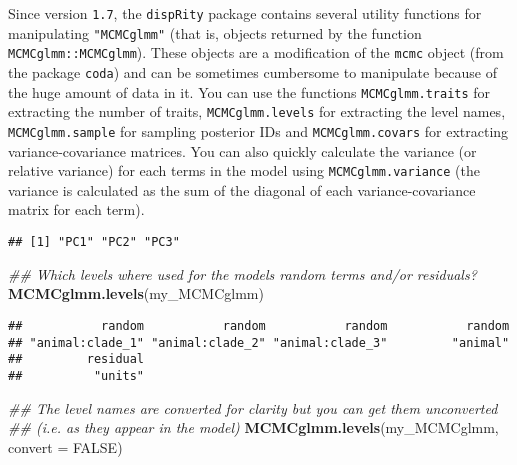 \documentclass[
]{book}
\newenvironment{Shaded}{\begin{snugshade}}{\end{snugshade}}
\newcommand{\CommentTok}[1]{\textcolor[rgb]{0.56,0.35,0.01}{\textit{#1}}}
\newcommand{\DataTypeTok}[1]{\textcolor[rgb]{0.13,0.29,0.53}{#1}}
\newcommand{\KeywordTok}[1]{\textcolor[rgb]{0.13,0.29,0.53}{\textbf{#1}}}
\newcommand{\NormalTok}[1]{#1}
\newcommand{\OperatorTok}[1]{\textcolor[rgb]{0.81,0.36,0.00}{\textbf{#1}}}
\newcommand{\OtherTok}[1]{\textcolor[rgb]{0.56,0.35,0.01}{#1}}
\newcommand{\StringTok}[1]{\textcolor[rgb]{0.31,0.60,0.02}{#1}}
\begin{document}
Since version \texttt{1.7}, the \texttt{dispRity} package contains several utility functions for manipulating \texttt{"MCMCglmm"} (that is, objects returned by the function \texttt{MCMCglmm::MCMCglmm}).
These objects are a modification of the \texttt{mcmc} object (from the package \texttt{coda}) and can be sometimes cumbersome to manipulate because of the huge amount of data in it.
You can use the functions \texttt{MCMCglmm.traits} for extracting the number of traits, \texttt{MCMCglmm.levels} for extracting the level names, \texttt{MCMCglmm.sample} for sampling posterior IDs and \texttt{MCMCglmm.covars} for extracting variance-covariance matrices. You can also quickly calculate the variance (or relative variance) for each terms in the model using \texttt{MCMCglmm.variance} (the variance is calculated as the sum of the diagonal of each variance-covariance matrix for each term).

\begin{Shaded}
\end{Shaded}

\begin{verbatim}
## [1] "PC1" "PC2" "PC3"
\end{verbatim}

\begin{Shaded}
\begin{Highlighting}[]
\CommentTok{\#\# Which levels where used for the model\textquotesingle{}s random terms and/or residuals?}
\KeywordTok{MCMCglmm.levels}\NormalTok{(my\_MCMCglmm)}
\end{Highlighting}
\end{Shaded}

\begin{verbatim}
##           random           random           random           random 
## "animal:clade_1" "animal:clade_2" "animal:clade_3"         "animal" 
##         residual 
##          "units"
\end{verbatim}

\begin{Shaded}
\begin{Highlighting}[]
\CommentTok{\#\# The level names are converted for clarity but you can get them unconverted}
\CommentTok{\#\# (i.e. as they appear in the model)}
\KeywordTok{MCMCglmm.levels}\NormalTok{(my\_MCMCglmm, }\DataTypeTok{convert =} \OtherTok{FALSE}\NormalTok{)}
\end{Highlighting}
\end{Shaded}
\end{document}
